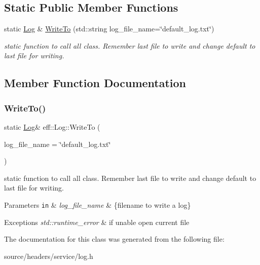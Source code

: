 \subsection*{Static Public Member Functions}
\begin{DoxyCompactItemize}
\item 
static \mbox{\hyperlink{classeff_1_1Log}{Log}} \& \mbox{\hyperlink{classeff_1_1Log_a2572f93cadda0f68d2918f98535c1a99}{Write\+To}} (std\+::string log\+\_\+file\+\_\+name=\char`\"{}default\+\_\+log.\+txt\char`\"{})
\begin{DoxyCompactList}\small\item\em static function to call all class. Remember last file to write and change default to last file for writing. \end{DoxyCompactList}\end{DoxyCompactItemize}


\subsection{Member Function Documentation}
\mbox{\label{classeff_1_1Log_a2572f93cadda0f68d2918f98535c1a99}} 
\subsubsection{\texorpdfstring{Write\+To()}{WriteTo()}}
{\footnotesize\ttfamily static \mbox{\hyperlink{classeff_1_1Log}{Log}}\& eff\+::\+Log\+::\+Write\+To (\begin{DoxyParamCaption}\item[{std\+::string}]{log\+\_\+file\+\_\+name = {\ttfamily \char`\"{}default\+\_\+log.txt\char`\"{}} }\end{DoxyParamCaption})\hspace{0.3cm}{\ttfamily [static]}}



static function to call all class. Remember last file to write and change default to last file for writing. 


\begin{DoxyParams}[1]{Parameters}
\mbox{\tt in}  & {\em log\+\_\+file\+\_\+name} & \{filename to write a log\} \\
\hline
\end{DoxyParams}

\begin{DoxyExceptions}{Exceptions}
{\em std\+::runtime\+\_\+error} & if unable open current file \\
\hline
\end{DoxyExceptions}


The documentation for this class was generated from the following file\+:\begin{DoxyCompactItemize}
\item 
source/headers/service/log.\+h\end{DoxyCompactItemize}
